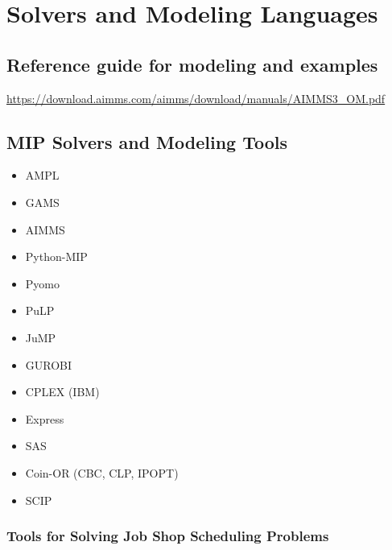 
%

\chapter{Solvers and Modeling Languages}
\label{ch:solvers}

\section{Reference guide for modeling and examples}
\url{https://download.aimms.com/aimms/download/manuals/AIMMS3_OM.pdf}

\section{MIP Solvers and Modeling Tools}

\begin{itemize}
\item AMPL
\item GAMS
\item AIMMS
\item Python-MIP
\item Pyomo
\item PuLP
\item JuMP
\end{itemize}

\begin{itemize}
\item GUROBI
\item CPLEX (IBM)
\item Express
\item SAS
\item Coin-OR (CBC, CLP, IPOPT)
\item SCIP
\end{itemize}

\subsection{Tools for Solving Job Shop Scheduling Problems}

